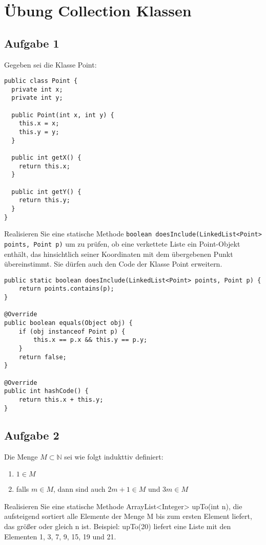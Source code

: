 \chapter{Übung Collection Klassen}

\section{Aufgabe 1}
Gegeben sei die Klasse Point:

\begin{lstlisting}
public class Point {
  private int x;
  private int y;

  public Point(int x, int y) {
    this.x = x;
    this.y = y;
  }

  public int getX() {
    return this.x;
  }

  public int getY() {
    return this.y;
  }
}
\end{lstlisting}

Realisieren Sie eine statische Methode \newline 
\lstinline{boolean doesInclude(LinkedList<Point> points, Point p)} um zu prüfen, ob eine
verkettete Liste ein Point-Objekt enthält, das hinsichtlich seiner Koordinaten
mit dem übergebenen Punkt übereinstimmt. Sie dürfen auch den Code der Klasse
Point erweitern.

\begin{lstlisting}
public static boolean doesInclude(LinkedList<Point> points, Point p) {
    return points.contains(p);
}

@Override
public boolean equals(Object obj) {
    if (obj instanceof Point p) {
        this.x == p.x && this.y == p.y;
    }
    return false;
}

@Override 
public int hashCode() {
    return this.x + this.y;
}
\end{lstlisting}

\section{Aufgabe 2}

Die Menge $M \subset \mathbb{N}$ sei wie folgt indukttiv definiert:

\begin{enumerate}
    \item $1 \in M$
    \item falls $m \in M$, dann sind auch $2m + 1 \in M$ und $3m \in M$
\end{enumerate}

Realisieren Sie eine statische Methode ArrayList<Integer> upTo(int n), die
aufsteigend sortiert alle Elemente der Menge M bis zum ersten Element liefert,
das größer oder gleich n ist. Beispiel: upTo(20) liefert eine Liste mit den
Elementen 1, 3, 7, 9, 15, 19 und 21.

